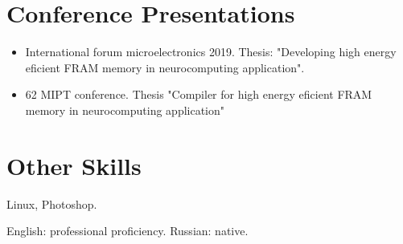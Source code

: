 \documentclass{article}
\begin{document}
\section{Conference Presentations }

\begin{itemize}
\item International forum microelectronics 2019. Thesis: "Developing high energy eficient FRAM memory in neurocomputing application".
\item 62 MIPT conference. Thesis "Compiler for high energy eficient FRAM memory in neurocomputing application"
\end{itemize}

 


\section{Other Skills}
\begin{description}[widest=Langauges]
\item[Software]	Linux, Photoshop.
\item[Languages]	English: professional proficiency.  Russian: native.
\end{description}
\end{document}
